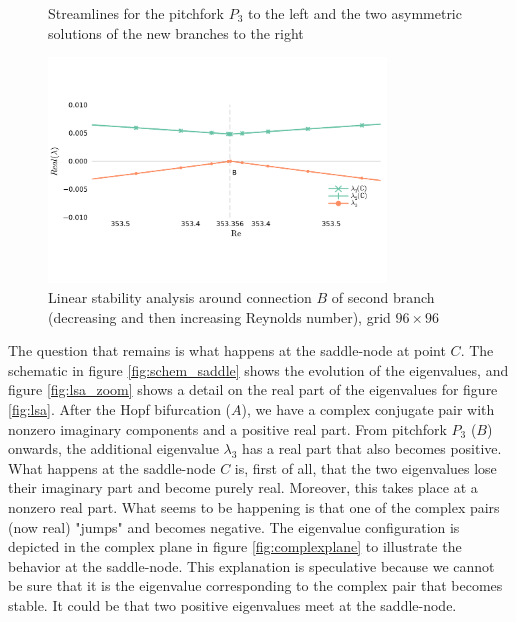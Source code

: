 \begin{figure}[h!]
\begin{subfigure}[b]{0.3\textwidth}
\end{subfigure}
\caption{Streamlines for the pitchfork $P_3$ to the left and the two asymmetric
  solutions of the new branches to the right}
\label{fig:sol_branch2}
\end{figure}

\begin{figure}[h!]
  \centering
  \includegraphics[trim={0 2.5cm 0 1cm},clip,width=0.8\textwidth]{figs/lsa_branch2_96x96.pdf}
  \caption{Linear stability analysis around connection $B$ of second branch
  (decreasing and then increasing Reynolds number), grid $96 \times 96$}
  \label{fig:lsa_branch2}
\end{figure}

The question that remains is what happens at the saddle-node at point $C$. The
schematic in figure \ref{fig:schem_saddle} shows the evolution of the
eigenvalues, and figure \ref{fig:lsa_zoom} shows a detail on the real part of
the eigenvalues for figure \ref{fig:lsa}. After the Hopf bifurcation ($A$), we
have a complex conjugate pair with nonzero imaginary components and a positive
real part. From pitchfork $P_3$ ($B$) onwards, the additional eigenvalue
$\lambda_3$ has a real part that also becomes positive. What happens at the
saddle-node $C$ is, first of all, that the two eigenvalues lose their imaginary
part and become purely real. Moreover, this takes place at a nonzero real part.
What seems to be happening is that one of the complex pairs (now real) "jumps"
and becomes negative. The eigenvalue configuration is depicted in the complex
plane in figure \ref{fig:complexplane} to illustrate the behavior at the
saddle-node. This explanation is speculative because we cannot be sure that it
is the eigenvalue corresponding to the complex pair that becomes stable. It
could be that two positive eigenvalues meet at the saddle-node.

